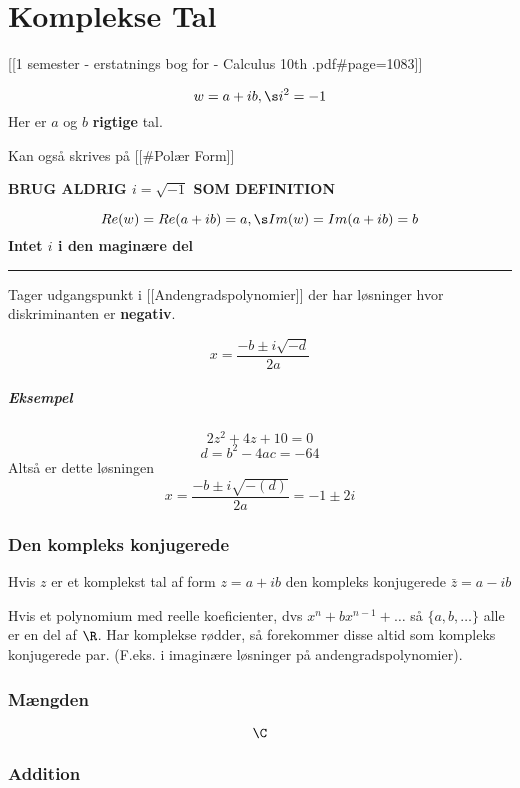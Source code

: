 \hypertarget{komplekse-tal}{%
\section{Komplekse Tal}\label{komplekse-tal}}

{[}{[}1 semester - erstatnings bog for - Calculus 10th
.pdf\#page=1083{]}{]}

\[w = a + ib, \s i^2 = -1\] Her er \(a\) og \(b\) \textbf{rigtige} tal.

Kan også skrives på {[}{[}\#Polær Form{]}{]}

\textbf{BRUG ALDRIG \(i = \sqrt{-1}\) SOM DEFINITION}

\[Re(w) = Re(a+ib)= a, \s Im(w) = Im(a+ib)  = b\] \textbf{Intet \(i\) i
den maginære del}

\begin{center}\rule{0.5\linewidth}{0.5pt}\end{center}

Tager udgangspunkt i {[}{[}Andengradspolynomier{]}{]} der har løsninger
hvor diskriminanten er \textbf{negativ}.

\[x = \frac{-b \pm i \sqrt{-d}}{2a}\]

\hypertarget{eksempel}{%
\subparagraph{Eksempel}\label{eksempel}}

\[2z^2 + 4z + 10 = 0\] \[d = b^2 - 4ac= -64\] Altså er dette løsningen
\[x = \frac{-b \pm i \sqrt{-(d)}}{2a} = -1 \pm 2i\]

\hypertarget{den-kompleks-konjugerede}{%
\subsubsection{Den kompleks
konjugerede}\label{den-kompleks-konjugerede}}

Hvis \(z\) er et komplekst tal af form \(z = a +ib\) den kompleks
konjugerede \(\bar{z} = a-ib\)

Hvis et polynomium med reelle koeficienter, dvs
\(x^n + bx^{n-1} + \dots\) så \(\{a,b, \dots\}\) alle er en del af
\(\R\). Har komplekse rødder, så forekommer disse altid som kompleks
konjugerede par. (F.eks. i imaginære løsninger på andengradspolynomier).

\hypertarget{muxe6ngden}{%
\subsubsection{Mængden}\label{muxe6ngden}}

\[\C\]

\hypertarget{addition}{%
\subsubsection{Addition}\label{addition}}

